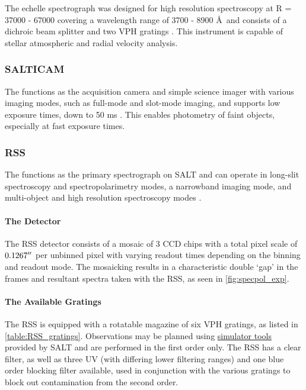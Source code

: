 The  echelle spectrograph was designed for high resolution spectroscopy at R = 37000 - 67000 covering a wavelength range of 3700 - 8900 \AA\ and consists of a dichroic beam splitter and two \gls{VPH} gratings \citep{SALT_hires}. This instrument is capable of stellar atmospheric and radial velocity analysis.

\subsubsection{\gls{SALTICAM}}

The  functions as the acquisition camera and simple science imager with various imaging modes, such as full-mode and slot-mode imaging, and supports low exposure times, down to 50 ms \citep{SALTICAM}. This enables photometry of faint objects, especially at fast exposure times.

\subsubsection{\gls{RSS}} \label{subsubsec:RSS}

The  functions as the primary spectrograph on \gls{SALT} and can operate in long-slit spectroscopy and spectropolarimetry modes, a narrowband imaging mode, and multi-object and high resolution spectroscopy modes \citep[for an in-depth discussion on operational modes see][or the \href{https://pysalt.salt.ac.za/proposal_calls/current/ProposalCall.html}{latest call for proposals}]{SALT_operational_modes}.

\paragraph{The Detector}
The \gls{RSS} detector consists of a mosaic of 3 \gls{CCD} chips with a total pixel scale of $0.1267\hbox{$^{\prime\prime}$}$ per unbinned pixel with varying readout times depending on the binning and readout mode. The mosaicking results in a characteristic double `gap' in the frames and resultant spectra taken with the \gls{RSS}, as seen in \autoref{fig:specpol_exp}.

\paragraph{The Available Gratings}
The \gls{RSS} is equipped with a rotatable magazine of six \gls{VPH} gratings, as listed in \autoref{table:RSS_gratings}. Observations may be planned using \href{https://astronomers.salt.ac.za/software/}{simulator tools} provided by \gls{SALT} and are performed in the first order only. The \gls{RSS} has a clear filter, as well as three \gls{UV} (with differing lower filtering ranges) and one blue order blocking filter available, used in conjunction with the various gratings to block out contamination from the second order.

